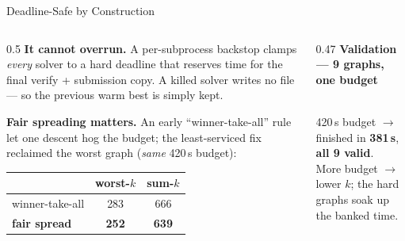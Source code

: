 \begin{frame}{Deadline-Safe by Construction}
  \begin{columns}[T]
    \begin{column}{0.5\textwidth}
      \textbf{It cannot overrun.} A per-subprocess backstop clamps \emph{every} solver
      to a hard deadline that reserves time for the final verify + submission copy.
      A killed solver writes no file --- so the previous warm best is simply kept.
      \medskip

      \textbf{Fair spreading matters.} An early ``winner-take-all'' rule let one
      descent hog the budget; the least-serviced fix reclaimed the worst graph
      (\emph{same} 420\,s budget):
      \begin{center}\small
      \begin{tabular}{lcc}
        \toprule
                       & worst-$k$ & sum-$k$ \\
        \midrule
        winner-take-all & 283 & 666 \\
        \textbf{fair spread} & \textbf{252} & \textbf{639} \\
        \bottomrule
      \end{tabular}
      \end{center}
    \end{column}
    \begin{column}{0.47\textwidth}
      \centering
      \textbf{Validation --- 9 graphs, one budget}
      \\[-2pt]
      \footnotesize
      420\,s budget $\to$ finished in \textbf{381\,s}, \textbf{all 9 valid}.\\
      More budget $\to$ lower $k$; the hard graphs soak up the banked time.
    \end{column}
  \end{columns}
\end{frame}

